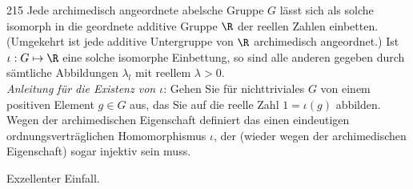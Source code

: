 \begin{algebraUE}{215}
Jede archimedisch angeordnete abelsche Gruppe $G$ lässt sich als solche isomorph
in die geordnete additive Gruppe $\R$ der reellen Zahlen einbetten. (Umgekehrt
ist jede additive Untergruppe von $\R$ archimedisch angeordnet.)
Ist $\iota: G \mapsto \R$ eine solche isomorphe Einbettung, so sind alle anderen
gegeben durch sämtliche Abbildungen $\lambda_l$ mit reellem $\lambda > 0$. \\
\textit{Anleitung für die Existenz von $\iota$}: Gehen Sie für nichttriviales
$G$ von einem positiven Element $g \in G$ aus, das Sie auf die reelle Zahl
$1 = \iota(g)$ abbilden. Wegen der archimedischen Eigenschaft definiert das
einen eindeutigen ordnungsverträglichen Homomorphismus $\iota$, der
(wieder wegen der archimedischen Eigenschaft) sogar injektiv sein muss.
\end{algebraUE}
\begin{solution}
Exzellenter Einfall.
\end{solution}
